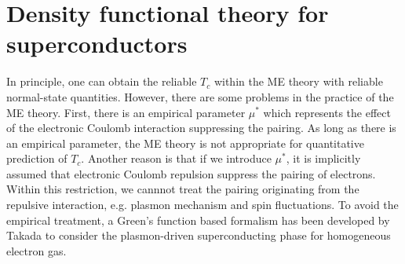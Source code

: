 

\section{Density functional theory for superconductors}
\label{scdft}

In principle, one can obtain the reliable $T_c$ within the ME theory with reliable normal-state quantities.
However, there are some problems in the practice of the ME theory. First, there is an empirical parameter $\mu^{\ast}$
which represents the effect of the electronic Coulomb interaction suppressing the pairing. 
As long as there is an empirical parameter, 
the ME theory is not appropriate for quantitative prediction of $T_c$.
Another reason is that if we introduce $\mu^{\ast}$, it is implicitly assumed that electronic
Coulomb repulsion suppress the pairing of electrons. Within this restriction, we cannnot treat the
pairing originating from the repulsive interaction, e.g. plasmon mechanism and spin fluctuations.
To avoid the empirical treatment, a Green's function based formalism has been developed by Takada
\cite{Takada1978plasmon} to consider the plasmon-driven superconducting phase for homogeneous electron gas.


